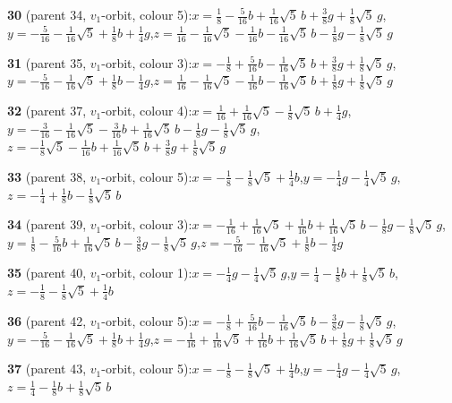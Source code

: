 \documentclass[10pt]{article}
\begin{document}
{\noindent\textbf{30} (parent 34, $v_1$-orbit, colour 5):\quad $x=\tfrac{1}{8}-\tfrac{5}{16}b+\tfrac{1}{16}\sqrt5\,b+\tfrac{3}{8}g+\tfrac{1}{8}\sqrt5\,g$,\quad $y=-\tfrac{5}{16}-\tfrac{1}{16}\sqrt5+\tfrac{1}{8}b+\tfrac{1}{4}g$,\quad $z=\tfrac{1}{16}-\tfrac{1}{16}\sqrt5-\tfrac{1}{16}b-\tfrac{1}{16}\sqrt5\,b-\tfrac{1}{8}g-\tfrac{1}{8}\sqrt5\,g$\par\smallskip
\noindent\textbf{31} (parent 35, $v_1$-orbit, colour 3):\quad $x=-\tfrac{1}{8}+\tfrac{5}{16}b-\tfrac{1}{16}\sqrt5\,b+\tfrac{3}{8}g+\tfrac{1}{8}\sqrt5\,g$,\quad $y=-\tfrac{5}{16}-\tfrac{1}{16}\sqrt5+\tfrac{1}{8}b-\tfrac{1}{4}g$,\quad $z=\tfrac{1}{16}-\tfrac{1}{16}\sqrt5-\tfrac{1}{16}b-\tfrac{1}{16}\sqrt5\,b+\tfrac{1}{8}g+\tfrac{1}{8}\sqrt5\,g$\par\smallskip
\noindent\textbf{32} (parent 37, $v_1$-orbit, colour 4):\quad $x=\tfrac{1}{16}+\tfrac{1}{16}\sqrt5-\tfrac{1}{8}\sqrt5\,b+\tfrac{1}{4}g$,\quad $y=-\tfrac{3}{16}-\tfrac{1}{16}\sqrt5-\tfrac{3}{16}b+\tfrac{1}{16}\sqrt5\,b-\tfrac{1}{8}g-\tfrac{1}{8}\sqrt5\,g$,\quad $z=-\tfrac{1}{8}\sqrt5-\tfrac{1}{16}b+\tfrac{1}{16}\sqrt5\,b+\tfrac{3}{8}g+\tfrac{1}{8}\sqrt5\,g$\par\smallskip
\noindent\textbf{33} (parent 38, $v_1$-orbit, colour 5):\quad $x=-\tfrac{1}{8}-\tfrac{1}{8}\sqrt5+\tfrac{1}{4}b$,\quad $y=-\tfrac{1}{4}g-\tfrac{1}{4}\sqrt5\,g$,\quad $z=-\tfrac{1}{4}+\tfrac{1}{8}b-\tfrac{1}{8}\sqrt5\,b$\par\smallskip
\noindent\textbf{34} (parent 39, $v_1$-orbit, colour 3):\quad $x=-\tfrac{1}{16}+\tfrac{1}{16}\sqrt5+\tfrac{1}{16}b+\tfrac{1}{16}\sqrt5\,b-\tfrac{1}{8}g-\tfrac{1}{8}\sqrt5\,g$,\quad $y=\tfrac{1}{8}-\tfrac{5}{16}b+\tfrac{1}{16}\sqrt5\,b-\tfrac{3}{8}g-\tfrac{1}{8}\sqrt5\,g$,\quad $z=-\tfrac{5}{16}-\tfrac{1}{16}\sqrt5+\tfrac{1}{8}b-\tfrac{1}{4}g$\par\smallskip
\noindent\textbf{35} (parent 40, $v_1$-orbit, colour 1):\quad $x=-\tfrac{1}{4}g-\tfrac{1}{4}\sqrt5\,g$,\quad $y=\tfrac{1}{4}-\tfrac{1}{8}b+\tfrac{1}{8}\sqrt5\,b$,\quad $z=-\tfrac{1}{8}-\tfrac{1}{8}\sqrt5+\tfrac{1}{4}b$\par\smallskip
\noindent\textbf{36} (parent 42, $v_1$-orbit, colour 5):\quad $x=-\tfrac{1}{8}+\tfrac{5}{16}b-\tfrac{1}{16}\sqrt5\,b-\tfrac{3}{8}g-\tfrac{1}{8}\sqrt5\,g$,\quad $y=-\tfrac{5}{16}-\tfrac{1}{16}\sqrt5+\tfrac{1}{8}b+\tfrac{1}{4}g$,\quad $z=-\tfrac{1}{16}+\tfrac{1}{16}\sqrt5+\tfrac{1}{16}b+\tfrac{1}{16}\sqrt5\,b+\tfrac{1}{8}g+\tfrac{1}{8}\sqrt5\,g$\par\smallskip
\noindent\textbf{37} (parent 43, $v_1$-orbit, colour 5):\quad $x=-\tfrac{1}{8}-\tfrac{1}{8}\sqrt5+\tfrac{1}{4}b$,\quad $y=-\tfrac{1}{4}g-\tfrac{1}{4}\sqrt5\,g$,\quad $z=\tfrac{1}{4}-\tfrac{1}{8}b+\tfrac{1}{8}\sqrt5\,b$\par\smallskip
}
\end{document}
